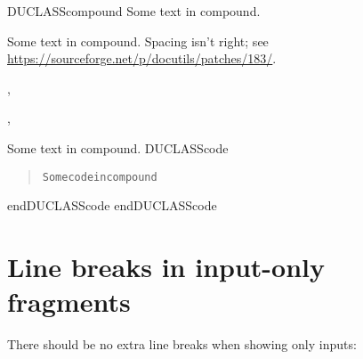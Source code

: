 \documentclass[a4paper]{article}
\newenvironment{DUclass}[1]%
  {%
   \def\DocutilsClassFunctionName{DUCLASS#1}
     \csname \DocutilsClassFunctionName \endcsname}%
  {\csname end\DocutilsClassFunctionName \endcsname}%
\begin{document}
\begin{DUclass}{compound}
Some text in compound.

Some text in compound.  Spacing isn't right; see \url{https://sourceforge.net/p/docutils/patches/183/}.

\begin{alectryon}
  \sep
  \begin{txt}
  \end{txt}
\end{alectryon}

\begin{alectryon}
  \sep
  \begin{txt}
  \end{txt}
\end{alectryon}
Some text in compound.
\begin{DUclass}{code}
\begin{quote}
\begin{alltt}
Some code in compound
\end{alltt}
\end{quote}
\end{DUclass}
\end{DUclass}


\section{Line breaks in input-only fragments%
  \label{line-breaks-in-input-only-fragments}%
}

There should be no extra line breaks when showing only inputs:
\end{document}
